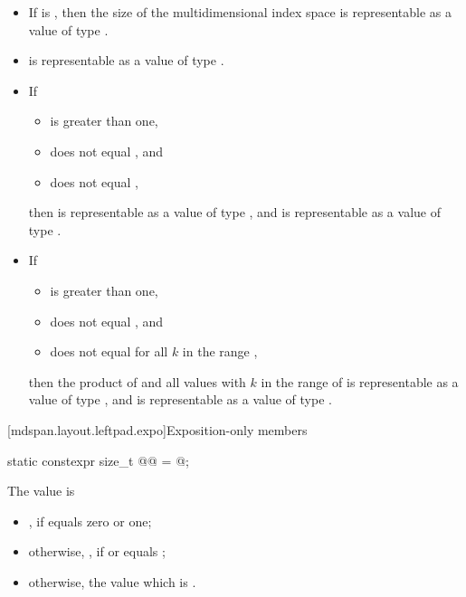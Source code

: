 \pnum
\mandates
\begin{itemize}
\item
If  is ,
then the size of the multidimensional index space 
is representable as a value of type .
\item
{} is representable as a value of type .
\item
If
\begin{itemize}
\item
{} is greater than one,
\item
{} does not equal , and
\item
{} does not equal ,
\end{itemize}
then 
is representable as a val\-ue of type , and
is representable as a value of type .
\item
If
\begin{itemize}
\item
{} is greater than one,
\item
{} does not equal , and
\item
{} does not equal 
for all $k$ in the range ,
\end{itemize}
then the product of
 and
all values 
with $k$ in the range of 
is representable as a value of type , and
is representable as a value of type .
\end{itemize}

[mdspan.layout.leftpad.expo]{Exposition-only members}

\begin{itemdecl}
static constexpr size_t @@ = @\seebelow@;
\end{itemdecl}

\begin{itemdescr}
\pnum
The value is
\begin{itemize}
\item
{}, if  equals zero or one;
\item
otherwise, ,
if  or  equals
;
\item
otherwise, the  value which is
.
\end{itemize}
\end{itemdescr}

